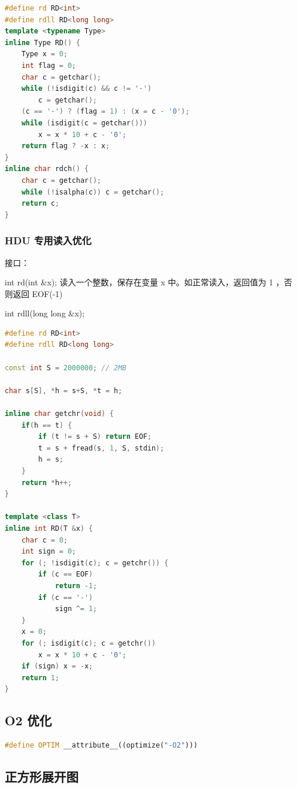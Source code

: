 \documentclass{article}
\begin{document}
\begin{lstlisting}[language=C++]
#define rd RD<int>
#define rdll RD<long long>
template <typename Type>
inline Type RD() {
    Type x = 0;
    int flag = 0;
    char c = getchar();
    while (!isdigit(c) && c != '-')
        c = getchar();
    (c == '-') ? (flag = 1) : (x = c - '0');
    while (isdigit(c = getchar()))
        x = x * 10 + c - '0';
    return flag ? -x : x;
}
inline char rdch() {
    char c = getchar();
    while (!isalpha(c)) c = getchar();
    return c;
}
\end{lstlisting}

\subsubsection{HDU 专用读入优化}

接口：

int rd(int \&x); 读入一个整数，保存在变量 x 中。如正常读入，返回值为 1 ，否则返回 EOF(-1)

int rdll(long long \&x);

\begin{lstlisting}[language=C++]
#define rd RD<int>
#define rdll RD<long long>

const int S = 2000000; // 2MB

char s[S], *h = s+S, *t = h;

inline char getchr(void) {
	if(h == t) {
		if (t != s + S) return EOF;
		t = s + fread(s, 1, S, stdin);
		h = s;
	}
	return *h++;
}

template <class T>
inline int RD(T &x) {
	char c = 0;
	int sign = 0;
	for (; !isdigit(c); c = getchr()) {
		if (c == EOF)
			return -1;
		if (c == '-')
			sign ^= 1;
	}
	x = 0;
	for (; isdigit(c); c = getchr())
		x = x * 10 + c - '0';
	if (sign) x = -x;
	return 1;
}
\end{lstlisting}

\subsection{O2 优化}

\begin{lstlisting}[language=C++]
#define OPTIM __attribute__((optimize("-O2")))
\end{lstlisting}

\subsection{正方形展开图}
\end{document}
